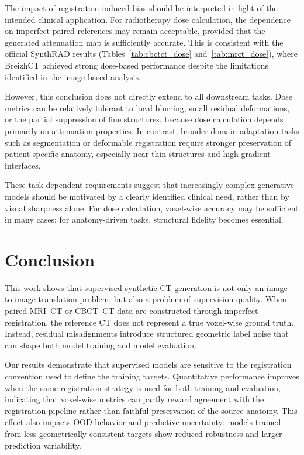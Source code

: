 \documentclass[lettersize,journal]{IEEEtran}
\begin{document}
The impact of registration-induced bias should be interpreted in light of the intended clinical application. For radiotherapy dose calculation, the dependence on imperfect paired references may remain acceptable, provided that the generated attenuation map is sufficiently accurate. This is consistent with the official SynthRAD results (Tables~\ref{tab:cbctct_dose} and~\ref{tab:mrct_dose}), where BreizhCT achieved strong dose-based performance despite the limitations identified in the image-based analysis.

However, this conclusion does not directly extend to all downstream tasks. Dose metrics can be relatively tolerant to local blurring, small residual deformations, or the partial suppression of fine structures, because dose calculation depends primarily on attenuation properties. In contrast, broader domain adaptation tasks such as segmentation or deformable registration require stronger preservation of patient-specific anatomy, especially near thin structures and high-gradient interfaces.

These task-dependent requirements suggest that increasingly complex generative models should be motivated by a clearly identified clinical need,
rather than by visual sharpness alone. For dose calculation, voxel-wise accuracy may be sufficient in many cases; for anatomy-driven tasks, structural fidelity becomes essential.

\section{Conclusion}

This work shows that supervised synthetic CT generation is not only an image-to-image translation problem, but also a problem of supervision quality. When paired MRI--CT or CBCT--CT data are constructed through imperfect registration, the reference CT does not represent a true voxel-wise ground truth. Instead, residual misalignments introduce structured geometric label noise that can shape both model training and model evaluation.

Our results demonstrate that supervised models are sensitive to the registration convention used to define the training targets. Quantitative
performance improves when the same registration strategy is used for both training and evaluation, indicating that voxel-wise metrics can partly reward agreement with the registration pipeline rather than faithful preservation of the source anatomy. This effect also impacts OOD behavior and predictive uncertainty: models trained from less geometrically consistent targets show reduced robustness and larger prediction variability.
\end{document}
